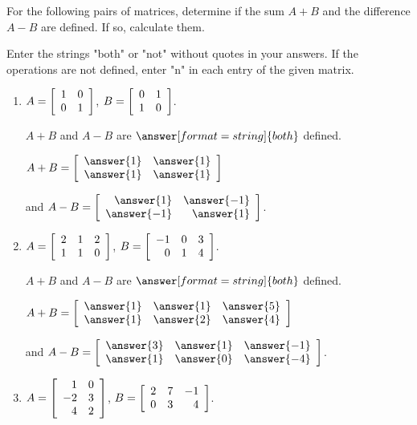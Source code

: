 \documentclass{ximera}
\author{Zack Reed}
\begin{document}
\begin{problem}

  For the following pairs of matrices, determine if the sum $A+B$
  and the difference $A-B$ are defined. If so, calculate them.

  \begin{hint}
    Enter the strings "both" or "not" without quotes in your answers. If the operations are not defined, enter "n" in each entry of the given matrix.
  \end{hint}

  \begin{enumerate}
  \item
    $A = \startmat{rr}
      1 & 0 \\
      0 & 1
    \stopmat$,\quad
    $B = \startmat{rr}
      0 & 1 \\
      1 & 0
    \stopmat$.

    $A+B$ and $A-B$ are $\answer[format=string]{both}$ defined.
    
    $A + B = \startmat{rr}
      \answer{1} & \answer{1} \\
      \answer{1} & \answer{1}
    \stopmat$
  
    and $A - B = \startmat{rr}
      \answer{1} & \answer{-1} \\
      \answer{-1} & \answer{1}
    \stopmat$.

  \item %
    $A = \startmat{rrr}
      2 & 1 & 2 \\
      1 & 1 & 0
    \stopmat$,\quad
    $B = \startmat{rrr}
      -1 & 0 & 3 \\
      0 & 1 & 4
    \stopmat$.

    $A+B$ and $A-B$ are $\answer[format=string]{both}$ defined.

    $A + B = \startmat{rrr}
      \answer{1} & \answer{1} & \answer{5} \\
      \answer{1} & \answer{2} & \answer{4}
    \stopmat$

    and $A - B = \startmat{rrr}
      \answer{3} & \answer{1} & \answer{-1} \\
      \answer{1} & \answer{0} & \answer{-4}
    \stopmat$.

  \item %
    $A = \startmat{rr}
      1 & 0 \\
      -2 & 3 \\
      4 & 2
    \stopmat$,\quad
    $B = \startmat{rrr}
      2 & 7 & -1 \\
      0 & 3 & 4
    \stopmat$.


\end{enumerate}
\end{problem}
\end{document}

